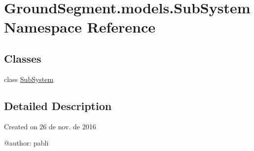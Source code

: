 \hypertarget{namespace_ground_segment_1_1models_1_1_sub_system}{}\section{Ground\+Segment.\+models.\+Sub\+System Namespace Reference}
\label{namespace_ground_segment_1_1models_1_1_sub_system}
\subsection*{Classes}
\begin{DoxyCompactItemize}
\item 
class \hyperlink{class_ground_segment_1_1models_1_1_sub_system_1_1_sub_system}{Sub\+System}
\end{DoxyCompactItemize}


\subsection{Detailed Description}
\begin{DoxyVerb}Created on 26 de nov. de 2016

@author: pabli
\end{DoxyVerb}
 